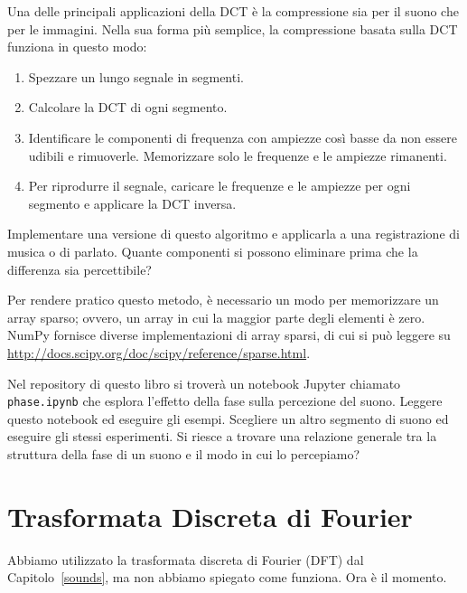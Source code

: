\documentclass[12pt,a4paper]{book}
\begin{document}
\begin{exercise} Una delle principali applicazioni della DCT è la compressione sia per il suono che per le immagini. Nella sua forma più semplice, la compressione basata sulla DCT funziona in questo modo:

\begin{enumerate} 

\item Spezzare un lungo segnale in segmenti.

\item Calcolare la DCT di ogni segmento.

\item Identificare le componenti di frequenza con ampiezze così basse da non essere udibili e rimuoverle. Memorizzare solo le frequenze e le ampiezze rimanenti.

\item Per riprodurre il segnale, caricare le frequenze e le ampiezze per ogni segmento e applicare la DCT inversa.

\end{enumerate} 

Implementare una versione di questo algoritmo e applicarla a una registrazione di musica o di parlato. Quante componenti si possono eliminare prima che la differenza sia percettibile?

Per rendere pratico questo metodo, è necessario un modo per memorizzare un array sparso; ovvero, un array in cui la maggior parte degli elementi è zero. NumPy fornisce diverse implementazioni di array sparsi, di cui si può leggere su \url{http://docs.scipy.org/doc/scipy/reference/sparse.html}. \end{exercise} 

\begin{exercise} Nel repository di questo libro si troverà un notebook Jupyter chiamato \verb"phase.ipynb" che esplora l'effetto della fase sulla percezione del suono. Leggere questo notebook ed eseguire gli esempi. Scegliere un altro segmento di suono ed eseguire gli stessi esperimenti. Si riesce a trovare una relazione generale tra la struttura della fase di un suono e il modo in cui lo percepiamo? \end{exercise} 

\chapter{Trasformata Discreta di Fourier} \label{dft} 

Abbiamo utilizzato la trasformata discreta di Fourier (DFT) dal Capitolo~\ref{sounds}, ma non abbiamo spiegato come funziona. Ora è il momento.
\end{document}
